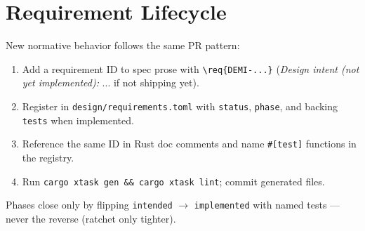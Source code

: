 \documentclass[11pt]{article}
\newcommand{\intent}[1]{\textit{Design intent (not yet implemented):} #1}
\begin{document}
\section{Requirement Lifecycle}\label{sec:lifecycle}
New normative behavior follows the same PR pattern:
\begin{enumerate}[nosep]
  \item Add a requirement ID to spec prose with \texttt{\textbackslash req\{DEMI-...\}}
        (\intent{...} if not shipping yet).
  \item Register in \texttt{design/requirements.toml} with \texttt{status},
        \texttt{phase}, and backing \texttt{tests} when implemented.
  \item Reference the same ID in Rust doc comments and name \texttt{\#[test]} functions in the registry.
  \item Run \texttt{cargo xtask gen \&\& cargo xtask lint}; commit generated files.
\end{enumerate}
Phases close only by flipping \texttt{intended} $\to$ \texttt{implemented} with
named tests --- never the reverse (ratchet only tighter).
\end{document}

